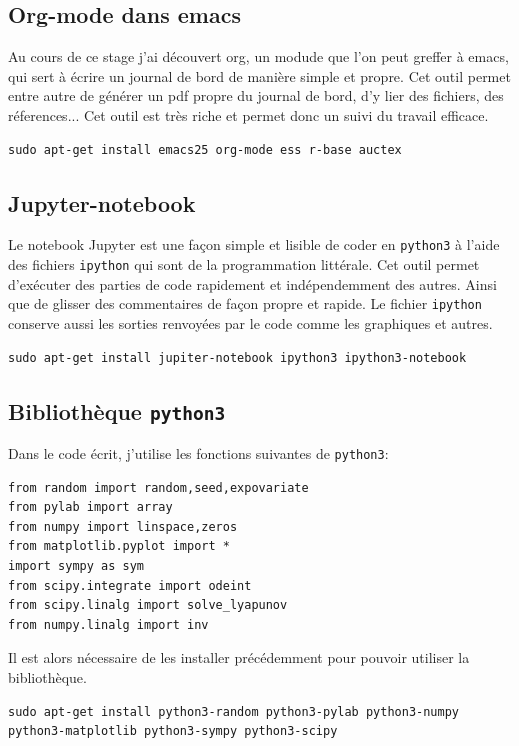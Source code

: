 \documentclass[a4paper,12pt]{report}
\begin{document}
\subsection{Org-mode dans emacs}
Au cours de ce stage j'ai découvert org, un modude que l'on peut
greffer à emacs, qui sert à écrire un journal de bord de manière simple
et propre. Cet outil permet entre autre de générer un pdf propre du
journal de bord, d'y lier des fichiers, des réferences... Cet outil
est très riche et permet donc un suivi du travail efficace.
\begin{verbatim}
sudo apt-get install emacs25 org-mode ess r-base auctex
\end{verbatim}

\subsection{Jupyter-notebook}
Le notebook Jupyter est une façon simple et lisible de
coder en \texttt{python3} à l'aide des fichiers \texttt{ipython} qui
sont de la programmation littérale. Cet outil permet d'exécuter
des parties de code rapidement et indépendemment des autres. Ainsi que
de glisser des commentaires de façon propre et rapide. Le fichier
\texttt{ipython} conserve aussi les sorties renvoyées par le code comme les
graphiques et autres.

\begin{verbatim}
sudo apt-get install jupiter-notebook ipython3 ipython3-notebook
\end{verbatim}

\subsection{Bibliothèque \texttt{python3}}
Dans le code écrit, j'utilise les fonctions suivantes de \texttt{python3}:
\begin{lstlisting}[frame=single]
from random import random,seed,expovariate
from pylab import array
from numpy import linspace,zeros
from matplotlib.pyplot import *
import sympy as sym
from scipy.integrate import odeint
from scipy.linalg import solve_lyapunov
from numpy.linalg import inv
\end{lstlisting}

Il est alors nécessaire de les installer précédemment pour pouvoir
utiliser la bibliothèque.

\begin{verbatim}
sudo apt-get install python3-random python3-pylab python3-numpy
python3-matplotlib python3-sympy python3-scipy 
\end{verbatim}
\end{document}
